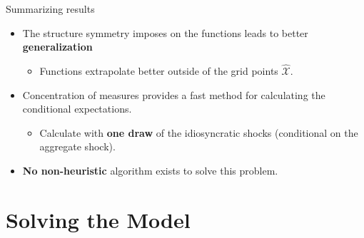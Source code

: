 \documentclass[aspectratio=169,10pt]{beamer}
\newcommand{\emphcolor}[1]{\textbf{\textcolor{emphcolorval}{#1}}}
\newcommand{\Xtrain}{\hat{\mathcal{X}}}
\begin{document}
\begin{frame}{Summarizing results}
	\begin{itemize}
		\item The structure symmetry imposes on the functions leads to better \emphcolor{generalization}\vspace{0.1in}
		\begin{itemize}
			\item Functions extrapolate better outside of the grid points $\Xtrain$.
		\end{itemize} \vspace{0.1in}
		\item Concentration of measures provides a fast method for calculating the conditional expectations. \vspace{0.1in}
		\begin{itemize}
			\item Calculate with \emphcolor{one draw} of the idiosyncratic shocks (conditional on the aggregate shock).\vspace{0.1in}
		\end{itemize} 
	\item \emphcolor{No non-heuristic} algorithm exists to solve this problem.
	\end{itemize}
\end{frame}
		\section{Solving the Model}
	
	
	
	
	
\end{document}
